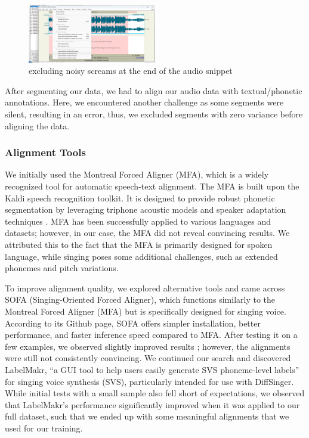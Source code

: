 \documentclass[a4paper]{article}
\begin{document}
	
	\begin{figure}[htbp]
		\centering
		\includegraphics[width=0.5\textwidth]{graphics/cutting_noise.png}
		\caption{excluding noisy screams at the end of the audio snippet}
		\label{fig:bild1}
	\end{figure}
	
	After segmenting our data, we had to align our audio data with textual/phonetic annotations. Here, we encountered another challenge as some segments were silent, resulting in an error, thus, we excluded segments with zero variance before aligning the data.
	
	\subsubsection{Alignment Tools}
	We initially used the Montreal Forced Aligner (MFA), which is a widely recognized tool for automatic speech-text alignment. The MFA is built upon the Kaldi speech recognition toolkit. It is designed to provide robust phonetic segmentation by leveraging triphone acoustic models and speaker adaptation techniques \cite{McAuliffe2017}. MFA has been successfully applied to various languages and datasets; however, in our case, the MFA did not reveal convincing results. We attributed this to the fact that the MFA is primarily designed for spoken language, while singing poses some additional challenges, such as extended phonemes and pitch variations. 
	
	To improve alignment quality, we explored alternative tools and came across SOFA (Singing-Oriented Forced Aligner), which functions similarly to the Montreal Forced Aligner (MFA) but is specifically designed for singing voice. According to its Github page, SOFA offers simpler installation, better performance, and faster inference speed compared to MFA. After testing it on a few examples, we observed slightly improved results \cite{Greenleaf2001}; however, the alignments were still not consistently convincing. We continued our search and discovered LabelMakr, “a GUI tool to help users easily generate SVS phoneme-level labels” \cite{spicytigermeat} for singing voice synthesis (SVS), particularly intended for use with DiffSinger. While initial tests with a small sample also fell short of expectations, we observed that LabelMakr's performance significantly improved when it was applied to our full dataset, such that we ended up with some meaningful alignments that we used for our training.
	
\end{document}
